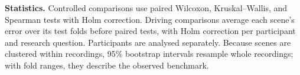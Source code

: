 \textbf{Statistics.}
Controlled comparisons use paired Wilcoxon, Kruskal--Wallis,
and Spearman tests with Holm correction. Driving comparisons average each scene's error over its test folds
before paired tests, with Holm correction per participant and
research question. Participants are analysed separately. Because
scenes are clustered within recordings, 95\% bootstrap intervals
resample whole recordings; with fold ranges, they describe the
observed benchmark.
